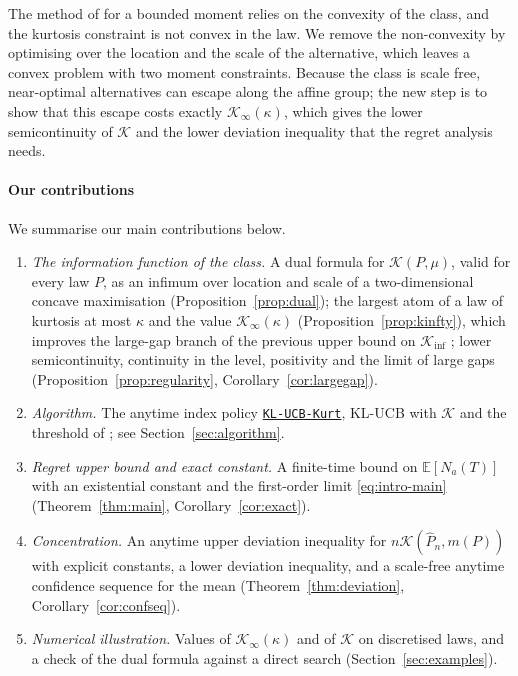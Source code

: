 \documentclass[11pt]{article}
\newcommand{\E}{\mathbb{E}}
\newcommand{\algo}{\hyperref[alg:kucb]{\texttt{KL-UCB-Kurt}}}
\begin{document}
The method of \citet{AJK21} for a bounded moment relies on the convexity of the class, and the kurtosis
constraint is not convex in the law. We remove the non-convexity by optimising over the location and
the scale of the alternative, which leaves a convex problem with two moment constraints. Because the
class is scale free, near-optimal alternatives can escape along the affine group; the new step is to
show that this escape costs exactly $\mathcal K_\infty(\kappa)$, which gives the lower semicontinuity of
$\mathcal K$ and the lower deviation inequality that the regret analysis needs.

\paragraph{Our contributions} We summarise our main contributions below.
\begin{enumerate}[label=(\roman*),leftmargin=2.2em]
  \item \emph{The information function of the class.} A dual formula for $\mathcal K(P,\mu)$, valid for every law
    $P$, as an infimum over location and scale of a two-dimensional concave maximisation
    (Proposition~\ref{prop:dual}); the largest atom of a law of kurtosis at most $\kappa$ and the value
    $\mathcal K_\infty(\kappa)$ (Proposition~\ref{prop:kinfty}), which improves the large-gap branch of the
    previous upper bound on $\mathcal{K}_{\inf}$ \citep[Theorem~9]{L17}; lower semicontinuity, continuity in the
    level, positivity and the limit of large gaps (Proposition~\ref{prop:regularity},
    Corollary~\ref{cor:largegap}).
  \item \emph{Algorithm.} The anytime index policy \algo{}, KL-UCB with $\mathcal K$ and the threshold of
    \citet{AJK21}; see Section~\ref{sec:algorithm}.
  \item \emph{Regret upper bound and exact constant.} A finite-time bound on $\E[N_a(T)]$ with an
    existential constant and the first-order limit \eqref{eq:intro-main} (Theorem~\ref{thm:main},
    Corollary~\ref{cor:exact}).
  \item \emph{Concentration.} An anytime upper deviation inequality for $n\mathcal K(\hat P_n,m(P))$ with explicit
    constants, a lower deviation inequality, and a scale-free anytime confidence sequence for the mean
    (Theorem~\ref{thm:deviation}, Corollary~\ref{cor:confseq}).
  \item \emph{Numerical illustration.} Values of $\mathcal K_\infty(\kappa)$ and of $\mathcal K$ on discretised laws,
    and a check of the dual formula against a direct search (Section~\ref{sec:examples}).
\end{enumerate}
\end{document}

